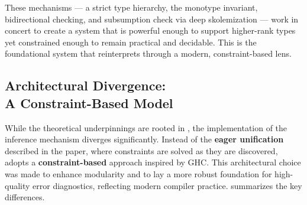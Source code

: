 These mechanisms --- a strict type hierarchy, the monotype invariant, bidirectional checking, and subsumption check via deep skolemization --- work in concert to create a system that is powerful enough to support higher-rank types yet constrained enough to remain practical and decidable. This is the foundational system that \Arralac reinterprets through a modern, constraint-based lens.

\subsection[Architectural Divergence: A Constraint-Based Model]{Architectural Divergence: \\ A Constraint-Based Model}
\label{sec:Design:ArralacApproach}

While the theoretical underpinnings are rooted in \cite{jones-practical-2007}, the implementation of the inference mechanism diverges significantly. Instead of the \textbf{eager unification} described in the paper, where constraints are solved as they are discovered, \Arralac adopts a \textbf{constraint-based} approach inspired by GHC. This architectural choice was made to enhance modularity and to lay a more robust foundation for high-quality error diagnostics, reflecting modern compiler practice.  summarizes the key differences.

